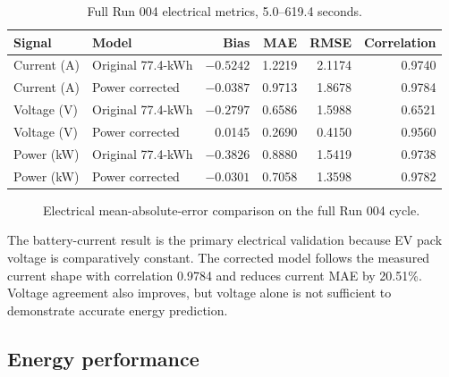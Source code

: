 \documentclass[11pt,letterpaper]{article}
\begin{document}
\begin{table}[H]
\centering
\caption{Full Run 004 electrical metrics, 5.0--619.4 seconds.}
\begin{tabular}{llrrrr}
\toprule
Signal & Model & Bias & MAE & RMSE & Correlation \\
\midrule
Current (A) & Original 77.4-kWh & $-0.5242$ & 1.2219 & 2.1174 & 0.9740 \\
Current (A) & Power corrected & $-0.0387$ & 0.9713 & 1.8678 & 0.9784 \\
Voltage (V) & Original 77.4-kWh & $-0.2797$ & 0.6586 & 1.5988 & 0.6521 \\
Voltage (V) & Power corrected & 0.0145 & 0.2690 & 0.4150 & 0.9560 \\
Power (kW) & Original 77.4-kWh & $-0.3826$ & 0.8880 & 1.5419 & 0.9738 \\
Power (kW) & Power corrected & $-0.0301$ & 0.7058 & 1.3598 & 0.9782 \\
\bottomrule
\end{tabular}
\end{table}

\begin{figure}[H]
\centering
{}
\caption{Electrical mean-absolute-error comparison on the full Run 004 cycle.}
\end{figure}

The battery-current result is the primary electrical validation because EV
pack voltage is comparatively constant. The corrected model follows the
measured current shape with correlation 0.9784 and reduces current MAE by
20.51\%. Voltage agreement also improves, but voltage alone is not sufficient
to demonstrate accurate energy prediction.

\subsection{Energy performance}
\end{document}
